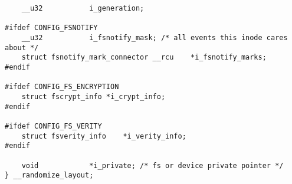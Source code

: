 \begin{lstlisting}
    __u32			i_generation;

#ifdef CONFIG_FSNOTIFY
    __u32			i_fsnotify_mask; /* all events this inode cares about */
    struct fsnotify_mark_connector __rcu	*i_fsnotify_marks;
#endif

#ifdef CONFIG_FS_ENCRYPTION
    struct fscrypt_info	*i_crypt_info;
#endif

#ifdef CONFIG_FS_VERITY
    struct fsverity_info	*i_verity_info;
#endif

    void			*i_private; /* fs or device private pointer */
} __randomize_layout;
\end{lstlisting}
